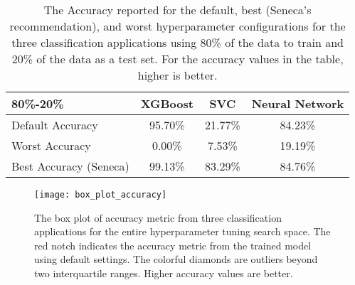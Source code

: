 \begin{table}
\centering
\begin{tabular}{|l|c|c|c|}
\hline
\textbf{80\%-20\%} & XGBoost & SVC & Neural Network\\
\hline
\hline
Default Accuracy & 95.70\% & 21.77\% & 84.23\%\\
\hline
Worst Accuracy&0.00\%&7.53\% & 19.19\%\\
\hline
Best Accuracy (Seneca) &99.13\% & 83.29\% & 84.76\%\\
\hline

\end{tabular}
\caption{The Accuracy reported for the 
default, best (Seneca's recommendation), and worst hyperparameter configurations for 
the three classification applications using 80\% of the data to train and 20\%
of the data as a test set. 
For the accuracy values in the table, higher is better.
\label{tab:accuracy}}
\end{table}

\begin{figure}[t] \centering 
\texttt{[image: box\_plot\_accuracy]}
\caption{The box plot of accuracy metric from three classification applications for the entire hyperparameter tuning search space. The red notch indicates the accuracy metric from the trained model using default settings. The colorful diamonds are outliers beyond two interquartile ranges. Higher accuracy values are better.
\label{fig:box_plot_accuracy}}
\end{figure}

